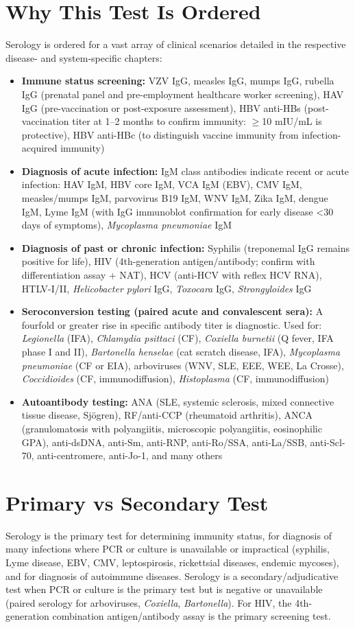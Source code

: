 \section*{Why This Test Is Ordered}
Serology is ordered for a vast array of clinical scenarios detailed in the respective disease- and system-specific chapters:
\begin{itemize}
  \item \textbf{Immune status screening:} VZV IgG, measles IgG, mumps IgG, rubella IgG (prenatal panel and pre-employment healthcare worker screening), HAV IgG (pre-vaccination or post-exposure assessment), HBV anti-HBs (post-vaccination titer at 1--2 months to confirm immunity: $\geq$10 mIU/mL is protective), HBV anti-HBc (to distinguish vaccine immunity from infection-acquired immunity)
  \item \textbf{Diagnosis of acute infection:} IgM class antibodies indicate recent or acute infection: HAV IgM, HBV core IgM, VCA IgM (EBV), CMV IgM, measles/mumps IgM, parvovirus B19 IgM, WNV IgM, Zika IgM, dengue IgM, Lyme IgM (with IgG immunoblot confirmation for early disease <30 days of symptoms), \textit{Mycoplasma pneumoniae} IgM
  \item \textbf{Diagnosis of past or chronic infection:} Syphilis (treponemal IgG remains positive for life), HIV (4th-generation antigen/antibody; confirm with differentiation assay + NAT), HCV (anti-HCV with reflex HCV RNA), HTLV-I/II, \textit{Helicobacter pylori} IgG, \textit{Toxocara} IgG, \textit{Strongyloides} IgG
  \item \textbf{Seroconversion testing (paired acute and convalescent sera):} A fourfold or greater rise in specific antibody titer is diagnostic. Used for: \textit{Legionella} (IFA), \textit{Chlamydia psittaci} (CF), \textit{Coxiella burnetii} (Q fever, IFA phase I and II), \textit{Bartonella henselae} (cat scratch disease, IFA), \textit{Mycoplasma pneumoniae} (CF or EIA), arboviruses (WNV, SLE, EEE, WEE, La Crosse), \textit{Coccidioides} (CF, immunodiffusion), \textit{Histoplasma} (CF, immunodiffusion)
  \item \textbf{Autoantibody testing:} ANA (SLE, systemic sclerosis, mixed connective tissue disease, Sjögren), RF/anti-CCP (rheumatoid arthritis), ANCA (granulomatosis with polyangiitis, microscopic polyangiitis, eosinophilic GPA), anti-dsDNA, anti-Sm, anti-RNP, anti-Ro/SSA, anti-La/SSB, anti-Scl-70, anti-centromere, anti-Jo-1, and many others
\end{itemize}

\section*{Primary vs Secondary Test}
Serology is the primary test for determining immunity status, for diagnosis of many infections where PCR or culture is unavailable or impractical (syphilis, Lyme disease, EBV, CMV, leptospirosis, rickettsial diseases, endemic mycoses), and for diagnosis of autoimmune diseases. Serology is a secondary/adjudicative test when PCR or culture is the primary test but is negative or unavailable (paired serology for arboviruses, \textit{Coxiella}, \textit{Bartonella}). For HIV, the 4th-generation combination antigen/antibody assay is the primary screening test.

